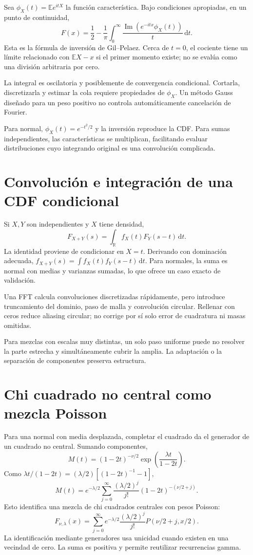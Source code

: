 \documentclass[11pt,a4paper]{article}
\newcommand{\R}{\mathbb R}
\newcommand{\E}{\mathbb E}
\newcommand{\dd}{\,\mathrm d}
\theoremstyle{definition}
\begin{document}
Sea $\phi_X(t)=\E e^{itX}$ la función característica. Bajo condiciones apropiadas, en un punto de continuidad,
\[
F(x)=\frac12-\frac1\pi\int_0^\infty
\frac{\operatorname{Im}(e^{-itx}\phi_X(t))}{t}\dd t.
\]
Esta es la fórmula de inversión de Gil--Pelaez. Cerca de $t=0$, el cociente tiene un límite relacionado con $\E X-x$ si el primer momento existe; no se evalúa como una división arbitraria por cero.

La integral es oscilatoria y posiblemente de convergencia condicional. Cortarla, discretizarla y estimar la cola requiere propiedades de $\phi_X$. Un método Gauss diseñado para un peso positivo no controla automáticamente cancelación de Fourier.

Para normal, $\phi_X(t)=e^{-t^2/2}$ y la inversión reproduce la CDF. Para sumas independientes, las características se multiplican, facilitando evaluar distribuciones cuyo integrando original es una convolución complicada.

\section{Convolución e integración de una CDF condicional}
Si $X,Y$ son independientes y $X$ tiene densidad,
\[
F_{X+Y}(s)=\int_\R f_X(t)F_Y(s-t)\dd t.
\]
La identidad proviene de condicionar en $X=t$. Derivando con dominación adecuada,
$f_{X+Y}(s)=\int f_X(t)f_Y(s-t)\dd t$. Para normales, la suma es normal con medias y varianzas sumadas, lo que ofrece un caso exacto de validación.

Una FFT calcula convoluciones discretizadas rápidamente, pero introduce truncamiento del dominio, paso de malla y convolución circular. Rellenar con ceros reduce aliasing circular; no corrige por sí solo error de cuadratura ni masas omitidas.

Para mezclas con escalas muy distintas, un solo paso uniforme puede no resolver la parte estrecha y simultáneamente cubrir la amplia. La adaptación o la separación de componentes preserva estructura.

\section{Chi cuadrado no central como mezcla Poisson}
Para una normal con media desplazada, completar el cuadrado da el generador de un cuadrado no central. Sumando componentes,
\[
M(t)=(1-2t)^{-\nu/2}
\exp\left(\frac{\lambda t}{1-2t}\right).
\]
Como $\lambda t/(1-2t)=(\lambda/2)[(1-2t)^{-1}-1]$,
\[
M(t)=e^{-\lambda/2}\sum_{j=0}^\infty
\frac{(\lambda/2)^j}{j!}(1-2t)^{-(\nu/2+j)}.
\]
Esto identifica una mezcla de chi cuadrados centrales con pesos Poisson:
\[
F_{\nu,\lambda}(x)=
\sum_{j=0}^\infty
e^{-\lambda/2}\frac{(\lambda/2)^j}{j!}
P(\nu/2+j,x/2).
\]
La identificación mediante generadores usa unicidad cuando existen en una vecindad de cero. La suma es positiva y permite reutilizar recurrencias gamma.
\end{document}
